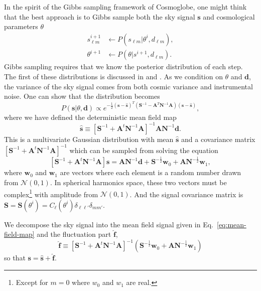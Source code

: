 \documentclass[twocolumn]{../common/aa}
\begin{document}
In the spirit of the Gibbs sampling framework of Cosmoglobe, one might think that the best approach is to Gibbs sample both the sky signal $\mathbf{s}$ and cosmological parameters $\theta$
\begin{align}
    s_{\ell m}^{i+1} &\leftarrow P(s_{\ell m} | \theta^{i}, d_{\ell m}),\\
    \label{eq:theta-gibbs}
    \theta^{i+1} &\leftarrow P(\theta | s^{i+1}, d_{\ell m}).
\end{align}
Gibbs sampling requires that we know the posterior distribution of each step. The first of these distributions is discussed in \cite{jewell2004} and \cite{wandelt2004}. As we condition on $\theta$ and $\textbf{d}$, the variance of the sky signal comes from both cosmic variance and instrumental noise. One can show that the distribution becomes
\begin{equation}
    P(\mathbf{s} | \theta, \mathbf{d}) \propto e^{-\frac12 \left(\mathbf{s} - \hat{\mathbf{s}}\right)^T \left(\mathbf{S}^{-1} - \mathbf{A}^T\mathbf{N}^{-1}\mathbf{A}\right) \left(\mathbf{s} - \hat{\mathbf{s}}\right)},
\end{equation}
where we have defined the deterministic mean field map
\begin{equation}
\label{eq:mean-field-map}
\hat{\textbf{s}} \equiv \left[\mathbf{S}^{-1} + \mathbf{A}^t \mathbf{N}^{-1}\mathbf{A} \right]^{-1} \mathbf{A} \mathbf{N}^{-1} \mathbf{d}.
\end{equation}
This is a multivariate Gaussian distribution with mean $\hat{\textbf{s}}$ and a covariance matrix $\left[\mathbf{S}^{-1} + \mathbf{A}^t \mathbf{N}^{-1}\mathbf{A} \right]^{-1}$ which can be sampled from solving the equation
\begin{equation}
    \label{eq:mapmakingeq}
    \left[\mathbf{S}^{-1} + \mathbf{A}^t \mathbf{N}^{-1}\mathbf{A} \right]\mathbf{s} = \mathbf{A} \mathbf{N}^{-1} \mathbf{d} + \mathbf{S}^{-\frac{1}{2}}\mathbf{w}_0 +\mathbf{A N}^{-\frac{1}{2}}\mathbf{w}_1,
\end{equation}
where $\mathbf{w}_0$ and $\mathbf{w}_1$ are vectors where each element is a random number drawn from $\mathcal{N}(0, 1)$. In spherical harmonics space, these two vectors must be complex\footnote{Except for $m=0$ where $w_0$ and $w_1$ are real.} with amplitude from $\mathcal{N}(0, 1)$. And the signal covariance matrix is $\mathbf{S} = \mathbf{S}(\theta^i) = C_{\ell}\left(\theta^i\right)\delta_{\ell \ell'}\delta_{mm'}$.

We decompose the sky signal into the mean field signal given in Eq.~\eqref{eq:mean-field-map} and the fluctuation part $\hat{\textbf{f}}$,
\begin{equation}
\label{eq:fluc-map}
\hat{\textbf{f}} \equiv \left[\mathbf{S}^{-1} + \mathbf{A}^t \mathbf{N}^{-1}\mathbf{A} \right]^{-1} \left(\mathbf{S}^{-\frac{1}{2}}\mathbf{w}_0 +\mathbf{A N}^{-\frac{1}{2}}\mathbf{w}_1 \right)
\end{equation}
so that $\mathbf{s} = \hat{\mathbf{s}} + \hat{\mathbf{f}}$.
\end{document}

